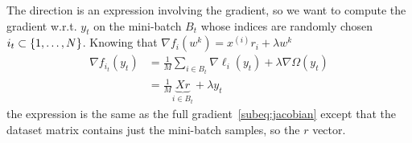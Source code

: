
The direction is an expression involving the gradient, so we want to compute the gradient w.r.t. $y_t$ on the mini-batch $B_t$ whose indices are randomly chosen $i_t\subset\{1,\dots,N\}$. Knowing that $\nabla f_i(w^k)=x^{(i)}r_i+\lambda w^k$
\begin{equation}\label{eq:mini-grad}
\begin{split}
\nabla f_{i_t}(y_t) &= \frac{1}{M}\sum_{i\in B_t}\nabla \ell_i(y_t)+\lambda\nabla\Omega(y_t) \\
 &= \frac{1}{M}\underbrace{Xr}_{i\in B_t}+\lambda y_t
\end{split}
\end{equation}
the expression is the same as the full gradient~\eqref{subeq:jacobian} except that the dataset matrix contains just the mini-batch samples, so the $r$ vector.


